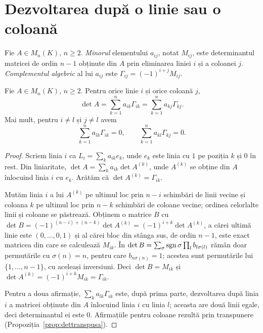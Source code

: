 \section{Dezvoltarea după o linie sau o coloană}

\begin{definitie}
Fie $A\in M_n(K)$, $n\ge2$. \emph{Minorul} elementului $a_{ij}$, notat $M_{ij}$, este determinantul matricei de ordin $n-1$ obținute din $A$ prin eliminarea liniei $i$ și a coloanei $j$. \emph{Complementul algebric} al lui $a_{ij}$ este $\Gamma_{ij}=(-1)^{i+j}M_{ij}$.
\end{definitie}

\begin{teorema}\label{teo:laplace}
Fie $A\in M_n(K)$, $n\ge2$. Pentru orice linie $i$ și orice coloană $j$,
\[
\det A=\sum_{k=1}^n a_{ik}\Gamma_{ik}=\sum_{k=1}^n a_{kj}\Gamma_{kj}.
\]
Mai mult, pentru $i\neq l$ și $j\neq l$ avem
\[
\sum_{k=1}^n a_{lk}\Gamma_{ik}=0,\qquad \sum_{k=1}^n a_{kl}\Gamma_{kj}=0 .
\]
\end{teorema}

\begin{proof}
Scriem linia $i$ ca $L_i=\sum_k a_{ik}e_k$, unde $e_k$ este linia cu $1$ pe poziția $k$ și $0$ în rest. Din liniaritate, $\det A=\sum_k a_{ik}\det A^{(k)}$, unde $A^{(k)}$ se obține din $A$ înlocuind linia $i$ cu $e_k$. Arătăm că $\det A^{(k)}=\Gamma_{ik}$.

Mutăm linia $i$ a lui $A^{(k)}$ pe ultimul loc prin $n-i$ schimbări de linii vecine și coloana $k$ pe ultimul loc prin $n-k$ schimbări de coloane vecine; ordinea celorlalte linii și coloane se păstrează. Obținem o matrice $B$ cu $\det B=(-1)^{(n-i)+(n-k)}\det A^{(k)}=(-1)^{i+k}\det A^{(k)}$, a cărei ultimă linie este $(0,\dots,0,1)$ și al cărei bloc din stânga sus, de ordin $n-1$, este exact matricea din care se calculează $M_{ik}$. În $\det B=\sum_\sigma\operatorname{sgn}\sigma\prod_l b_{l\sigma(l)}$ rămân doar permutările cu $\sigma(n)=n$, pentru care $b_{n\sigma(n)}=1$; acestea sunt permutările lui $\{1,\dots,n-1\}$, cu aceleași inversiuni. Deci $\det B=M_{ik}$ și $\det A^{(k)}=(-1)^{i+k}M_{ik}=\Gamma_{ik}$.

Pentru a doua afirmație, $\sum_k a_{lk}\Gamma_{ik}$ este, după prima parte, dezvoltarea după linia $i$ a matricei obținute din $A$ înlocuind linia $i$ cu linia $l$; aceasta are două linii egale, deci determinantul ei este $0$. Afirmațiile pentru coloane rezultă prin transpunere (Propoziția~\ref{prop:dettranspusa}).
\end{proof}

